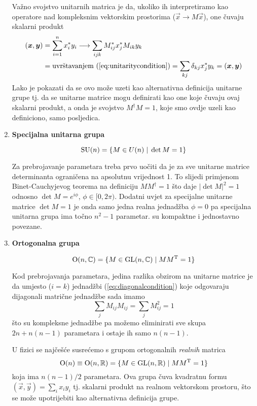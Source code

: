 \begin{enumerate}[leftmargin=0pt, itemindent=0pt]
Važno svojstvo unitarnih matrica je da, ukoliko ih interpretiramo kao
operatore nad kompleksnim vektorskim prostorima ($\vec{x} \to M\vec{x}$), 
one čuvaju skalarni produkt
\begin{align}
    (\vec{x}, \vec{y})& = \sum_{i=1}^n x_{i}^* y_i  \longrightarrow
   \sum_{ijk} M^{*}_{ij}x^{*}_j M_{ik}y_{k} \nonumber \\
 & = \text{uvrštavanjem
 (\ref{eq:unitaritycondition})} = \sum_{kj} \delta_{kj} x^{*}_j y_k = (\vec{x}, \vec{y})
\label{eq:productinvariance}
\end{align}
Lako je pokazati da se ovo može uzeti kao alternativna definicija
unitarne grupe tj. da se unitarne matrice mogu definirati kao one koje
čuvaju ovaj skalarni produkt, a onda je svojstvo $M^{\dagger} M = 1$, koje
smo ovdje uzeli kao definiciono, samo posljedica.

\item \textbf{Specijalna unitarna grupa}

\begin{equation}
\mathrm{SU}(n) = \{ M\in U(n) \; | \; \det M  = 1\}
\end{equation}

Za prebrojavanje parametara treba prvo uočiti da je za sve unitarne
matrice determinanta ograničena na apsolutnu vrijednost 1. To slijedi
primjenom Binet-Cauchyjevog teorema na definiciju $M M^{\dagger} = 1$
što daje $|\det M|^2 = 1$ odnosno $\det M = e^{i \phi}$, 
$\phi\in [0, 2\pi)$.
Dodatni uvjet za specijalne unitarne matrice $\det M = 1$ je onda
samo jedna realna jednadžba $\phi = 0$ pa specijalna unitarna grupa
ima točno $n^2 - 1$ parametar.  su kompaktne i jednostavno povezane.

\item \textbf{Ortogonalna grupa}

\begin{equation}
\mathrm{O}(n, \mathbb{C}) = \{ M\in \mathrm{GL}(n,\mathbb{C}) \; | \; M M^{\mathrm{T}} = 1\}
\end{equation}

Kod prebrojavanja parametara, jedina razlika obzirom na unitarne matrice
je da umjesto ($i=k$) jednadžbi (\ref{eq:diagonalcondition}) 
koje odgovaraju dijagonali matrične jednadžbe sada imamo
\begin{equation}
 \sum_j M_{ij} M_{ij} = \sum_j M_{ij}^2 = 1
\end{equation}
što su kompleksne jednadžbe pa možemo eliminirati sve skupa
$2n + n(n-1)$ parametara i ostaje ih samo $n(n-1)$.

U fizici se najčešće susrećemo s grupom ortogonalnih \emph{realnih} matrica
\begin{equation}
\mathrm{O}(n) \equiv \mathrm{O}(n, \mathbb{R}) = \{ M\in \mathrm{GL}(n,\mathbb{R}) \; | \; M M^{\mathrm{T}} = 1\}
\end{equation}
koja ima $n(n-1)/2$ parametara. Ova grupa čuva
kvadratnu formu $(\vec{x}, \vec{y}) = \sum_i x_i y_i$ tj. skalarni produkt na realnom
vektorskom prostoru, što se može upotrijebiti kao alternativna definicija grupe.


\end{enumerate}
